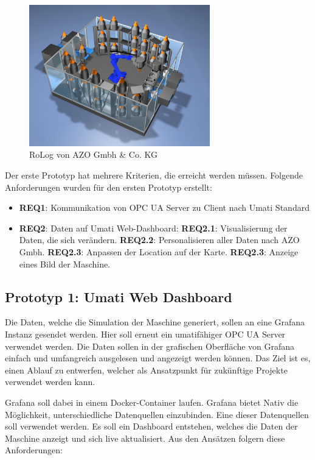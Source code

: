 \documentclass[a4paper, 12pt, oneside, toc=listofnumbered, bibliography=totoc]{scrbook}
\begin{document}
		\begin{figure}[H]
			\centering
			\includegraphics[width=0.7\textwidth]{res/RoLog.png}
			\caption{RoLog von AZO Gmbh \& Co. KG \cite{noauthor_azo_nodate}}
			\label{fig:RoLog}
		\end{figure}
	
		Der erste Prototyp hat mehrere Kriterien, die erreicht werden müssen. Folgende Anforderungen wurden für den ersten Prototyp erstellt:
		
		\begin{itemize}
			\item \textbf{REQ1}: Kommunikation von OPC UA Server zu Client nach Umati Standard
			\item \textbf{REQ2}: Daten auf Umati Web-Dashboard:
			\subitem \textbf{REQ2.1}: Visualisierung der Daten, die sich verändern.
			\subitem \textbf{REQ2.2}: Personalisieren aller Daten nach AZO Gmbh.
			\subitem \textbf{REQ2.3}: Anpassen der Location auf der Karte.
			\subitem \textbf{REQ2.3}: Anzeige eines Bild der Maschine.
		\end{itemize}
		
		\subsection{Prototyp 1: Umati Web Dashboard}
		
		Die Daten, welche die Simulation der Maschine generiert, sollen an eine Grafana Instanz gesendet werden. Hier soll erneut ein umatifähiger OPC UA Server verwendet werden. Die Daten sollen in der grafischen Oberfläche von Grafana einfach und umfangreich ausgelesen und angezeigt werden können. Das Ziel ist es, einen Ablauf zu entwerfen, welcher als Ansatzpunkt für zukünftige Projekte verwendet werden kann. 
		
		Grafana soll dabei in einem Docker-Container laufen. Grafana bietet Nativ die Möglichkeit, unterschiedliche Datenquellen einzubinden. Eine dieser Datenquellen soll verwendet werden. Es soll ein Dashboard entstehen, welches die Daten der Maschine anzeigt und sich live aktualisiert. Aus den Ansätzen folgern diese Anforderungen:
		
\end{document}
